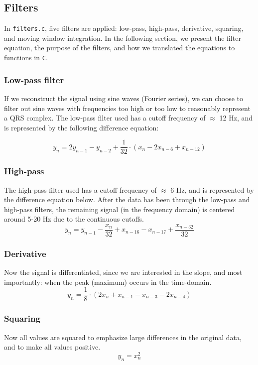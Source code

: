 \subsection{Filters}
In \texttt{filters.c}, five filters are applied: low-pass, high-pass, derivative, squaring, and moving window integration. In the following section, we present the filter equation, the purpose of the filters, and how we translated the equations to functions in \texttt{C}. 

\subsubsection{Low-pass filter}
If we reconstruct the signal using sine waves (Fourier series), we can choose to filter out sine waves with frequencies too high or too low to reasonably represent a QRS complex. The low-pass filter used has a cutoff frequency of $\approx$ 12 Hz, and is represented by the following difference equation:

\begin{equation}
    y_n = 2y_{n-1} - y_{n-2} + \frac{1}{32} \cdot (x_n - 2x_{n-6} + x_{n-12})
\end{equation}

\subsubsection{High-pass}
The high-pass filter used has a cutoff frequency of $\approx$ 6 Hz, and is represented by the difference equation below. After the data has been through the low-pass and high-pass filters, the remaining signal (in the frequency domain) is centered around 5-20 Hz due to the continuous cutoffs. 
\begin{equation}
    y_n = y_{n-1} -\frac{x_n}{32} + x_{n-16} - x_{n-17} + \frac{x_{n-32}}{32}
\end{equation}

\subsubsection{Derivative}
Now the signal is differentiated, since we are interested in the slope, and most importantly: when the peak (maximum) occurs in the time-domain. 
\begin{equation}
    y_n = \frac{1}{8} \cdot (2x_n + x_{n-1} - x_{n-3} - 2x_{n-4} )
\end{equation}

\subsubsection{Squaring}
Now all values are squared to emphasize large differences in the original data, and to make all values positive.
\begin{equation}
    y_n = x_n^2
\end{equation}


